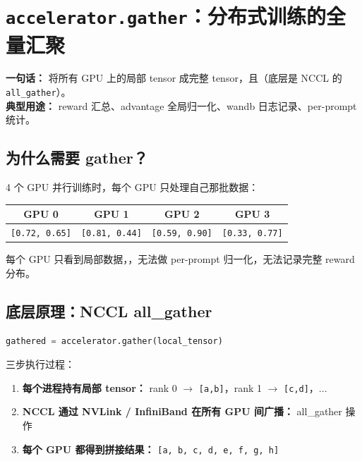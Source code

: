 
\section{\texttt{accelerator.gather}：分布式训练的全量汇聚}

\begin{conceptbox}
\textbf{一句话：}  将所有 GPU 上的局部 tensor 成完整 tensor，且（底层是 NCCL 的 \texttt{all\_gather}）。\\
\textbf{典型用途：} reward 汇总、advantage 全局归一化、wandb 日志记录、per-prompt 统计。
\end{conceptbox}

\subsection{为什么需要 gather？}

4 个 GPU 并行训练时，每个 GPU 只处理自己那批数据：

\begin{center}
\begin{tabular}{cccc}
\hline
GPU 0 & GPU 1 & GPU 2 & GPU 3 \\
\hline
\texttt{[0.72, 0.65]} & \texttt{[0.81, 0.44]} & \texttt{[0.59, 0.90]} & \texttt{[0.33, 0.77]} \\
\hline
\end{tabular}
\end{center}

每个 GPU 只看到局部数据，，无法做 per-prompt 归一化，无法记录完整 reward 分布。

\subsection{底层原理：NCCL all\_gather}

\begin{lstlisting}[language=Python]
gathered = accelerator.gather(local_tensor)
\end{lstlisting}

三步执行过程：

\begin{enumerate}[leftmargin=1.5em]
  \item \textbf{每个进程持有局部 tensor：} rank 0 $\to$ \texttt{[a,b]}，rank 1 $\to$ \texttt{[c,d]}，...
  \item \textbf{NCCL 通过 NVLink / InfiniBand 在所有 GPU 间广播：} all\_gather 操作
  \item \textbf{每个 GPU 都得到拼接结果：} \texttt{[a, b, c, d, e, f, g, h]}
\end{enumerate}

